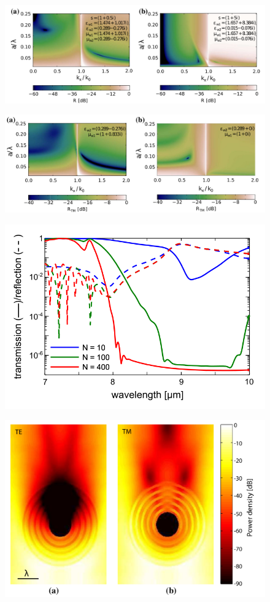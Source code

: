 \begin{figure}[tb]
	\includegraphics[width=\textwidth]{images/pml/oqe_reflection_kat.png}
\end{figure}

\begin{figure}[tb]
	\includegraphics[width=\textwidth]{images/pml/oqe_reflection_kat_simp.png}
\end{figure}

\begin{figure}[tb]
	\includegraphics[width=\textwidth]{images/pml/oqe_trans_refl.png}
\end{figure}

\begin{figure}[tb]
	\includegraphics[width=\textwidth]{images/pml/oqe_coreshell.png}
\end{figure}


